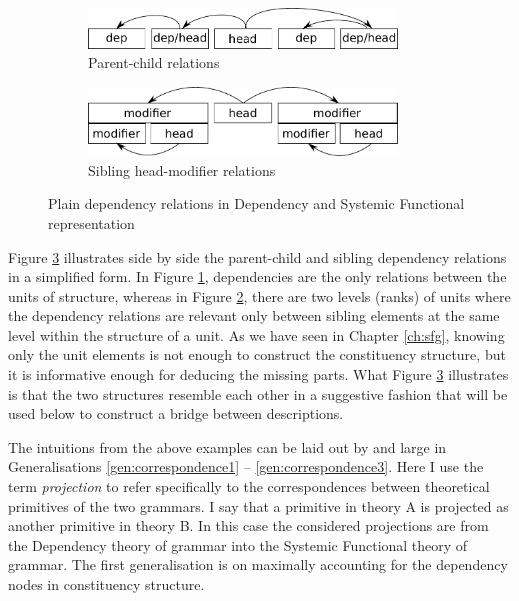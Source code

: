     \begin{figure}[!ht]
        \centering
        \begin{subfigure}{.5\textwidth}
            \centering
            \includegraphics[width=0.9\textwidth]{Figures/SFL-grammar/dependency-dg.pdf}
            \vspace{+22pt}
            \caption{Parent-child relations}
            \label{fig:dependency-dg}
        \end{subfigure}%
        \begin{subfigure}{.5\textwidth}
            \centering
            \includegraphics[width=0.9\textwidth]{Figures/SFL-grammar/dependency-sfg.pdf}
            \caption{Sibling head-modifier relations}
            \label{fig:dependency-sfg}
        \end{subfigure}
        \caption{Plain dependency relations in Dependency and Systemic Functional representation}
        \label{fig:dependency-relations}
    \end{figure}

    Figure \ref{fig:dependency-relations} illustrates side by side the parent-child and sibling dependency relations in a simplified form. In Figure \ref{fig:dependency-dg}, dependencies are the only relations between the units of structure, whereas in Figure \ref{fig:dependency-sfg}, there are two levels (ranks) of units where the dependency relations are relevant only between sibling elements at the same level within the structure of a unit. As we have seen in Chapter \ref{ch:sfg}, knowing only the unit elements is not enough to construct the constituency structure, but it is informative enough for deducing the missing parts. What Figure \ref{fig:dependency-relations} illustrates is that the two structures resemble each other in a suggestive fashion that will be used below to construct a bridge between descriptions.  


    The intuitions from the above examples can be laid out by and large in Generalisations \ref{gen:correspondence1} -- \ref{gen:correspondence3}. Here I use the term \textit{projection} to refer specifically to the correspondences between theoretical primitives of the two grammars. I say that a primitive in theory A is projected as another primitive in theory B. In this case the considered projections are from the Dependency theory of grammar into the Systemic Functional theory of grammar. The first generalisation is on maximally accounting for the dependency nodes in constituency structure.

